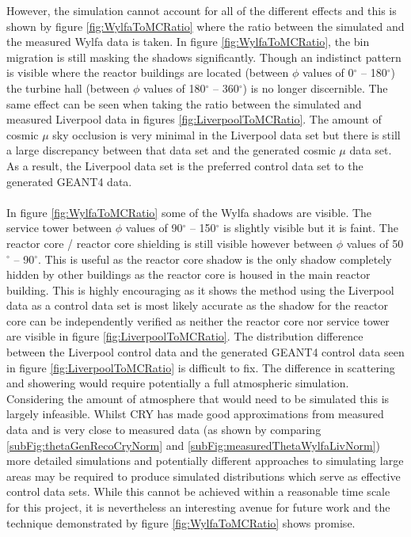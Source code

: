 However, the simulation cannot account for all of the different effects and this is shown by figure \ref{fig:WylfaToMCRatio} where the ratio between the simulated and the measured Wylfa data is taken. In figure \ref{fig:WylfaToMCRatio}, the bin migration is still masking the shadows significantly. Though an indistinct pattern is visible where the reactor buildings are located (between $\phi$ values of 0$^\circ$ -- 180$^\circ$) the turbine hall (between $\phi$ values of 180$^\circ$ -- 360$^\circ$) is no longer discernible. The same effect can be seen when taking the ratio between the simulated and measured Liverpool data in figures \ref{fig:LiverpoolToMCRatio}. The amount of cosmic $\mu$ sky occlusion is very minimal in the Liverpool data set but there is still a large discrepancy between that data set and the generated cosmic $\mu$ data set. As a result, the Liverpool data set is the preferred control data set to the generated GEANT4 data. 
\\\\ In figure \ref{fig:WylfaToMCRatio} some of the Wylfa shadows are visible. The service tower between $\phi$ values of 90$^\circ$ -- 150$^\circ$ is slightly visible but it is faint. The reactor core / reactor core shielding is still visible however between $\phi$ values of 50$^\circ$ -- 90$^\circ$. This is useful as the reactor core shadow is the only shadow completely hidden by other buildings as the reactor core is housed in the main reactor building. This is highly encouraging as it shows the method using the Liverpool data as a control data set is most likely accurate as the shadow for the reactor core can be independently verified as neither the reactor core nor service tower are visible in figure \ref{fig:LiverpoolToMCRatio}. The distribution difference between the Liverpool control data and the generated GEANT4 control data seen in figure \ref{fig:LiverpoolToMCRatio} is difficult to fix. The difference in scattering and showering would require potentially a full atmospheric simulation. Considering the amount of atmosphere that would need to be simulated this is largely infeasible. Whilst CRY has made good approximations from measured data and is very close to measured data (as shown by comparing \ref{subFig:thetaGenRecoCryNorm} and \ref{subFig:measuredThetaWylfaLivNorm}) more detailed simulations and potentially different approaches to simulating large areas may be required to produce simulated distributions which serve as effective control data sets. While this cannot be achieved within a reasonable time scale for this project, it is nevertheless an interesting avenue for future work and the technique demonstrated by figure \ref{fig:WylfaToMCRatio} shows promise. 

